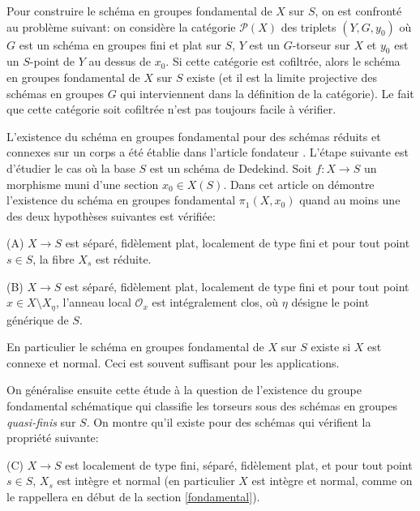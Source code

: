 \documentclass[11pt]{amsart}
\numberwithin{equation}{section}
\theoremstyle{definition}
\theoremstyle{remark}
\newcommand{\dO}{{\mathcal O}}
\begin{document}
Pour construire le sch\'ema en groupes fondamental de $X$ sur $S$, on est confront\'e au probl\`eme suivant: on consid\`ere la cat\'egorie $\mathcal{P}(X)$ des triplets $(Y,G,y_0)$ o\`u $G$ est un sch\'ema en groupes fini et plat sur $S$, $Y$ est un $G$-torseur sur $X$ et $y_0$ est un $S$-point de $Y$ au dessus de $x_0$. Si cette cat\'egorie est cofiltr\'ee, alors le sch\'ema en groupes fondamental de $X$ sur $S$ existe (et il est la limite projective des sch\'emas en groupes $G$ qui interviennent dans la d\'efinition de la cat\'egorie). Le fait que cette cat\'egorie soit cofiltr\'ee n'est pas toujours facile \`a v\'erifier.

L'existence du sch\'ema en groupes fondamental pour des sch\'emas r\'eduits et connexes sur un corps a \'et\'e \'etablie dans l'article fondateur \cite{Nor2}.  L'\'etape suivante est d'\'etudier le cas o\`u la base $S$ est un sch\'ema de Dedekind. Soit $f:X\to S$ un morphisme muni d'une section $x_0\in X(S)$. Dans cet article on d\'emontre l'existence du sch\'ema en groupes fondamental $\pi_1(X,x_0)$ quand au moins une des deux hypoth\`eses suivantes est v\'erifi\'ee:

\smallskip

(A) $X\to S$ est s\'epar\'e, fid\`element plat, localement de type fini et pour tout point $s\in S$, la fibre $X_s$ est r\'eduite.
\smallskip

(B) $X\to S$ est s\'epar\'e, fid\`element plat, localement de type fini et pour tout point $x\in X\setminus X_{\eta}$, l'anneau local $\dO _x$ est int\'egralement clos, o\`u $\eta $ d\'esigne le point g\'en\'erique de $S$.
\smallskip

En particulier le sch\'ema en groupes fondamental de $X$ sur $S$ existe si $X$ est connexe et normal. Ceci est souvent suffisant pour les applications.
\medskip

On g\'en\'eralise ensuite cette \'etude \`a la question de l'existence du groupe fondamental sch\'ematique qui classifie les torseurs sous des sch\'emas en groupes {\it quasi-finis} sur $S$. On montre qu'il existe pour des sch\'emas qui v\'erifient la propri\'et\'e suivante:

\smallskip

(C) $X\to S$ est localement de type fini, s\'epar\'e, fid\`element plat, et pour tout point $s\in S$, $X_s$ est int\`egre et normal (en particulier $X$ est int\`egre et normal, comme on le rappellera en d\'ebut de la section \ref{fondamental}).
\medskip
\end{document}
